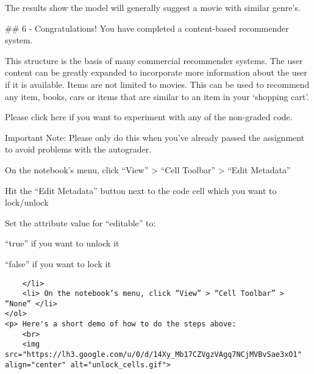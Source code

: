\documentclass[11pt]{article}
\begin{document}
    The results show the model will generally suggest a movie with similar
genre's.

    \#\# 6 - Congratulations! You have completed a content-based recommender
system.

This structure is the basis of many commercial recommender systems. The
user content can be greatly expanded to incorporate more information
about the user if it is available. Items are not limited to movies. This
can be used to recommend any item, books, cars or items that are similar
to an item in your `shopping cart'.

    Please click here if you want to experiment with any of the non-graded
code.

Important Note: Please only do this when you've already passed the
assignment to avoid problems with the autograder.

On the notebook's menu, click ``View'' \textgreater{} ``Cell Toolbar''
\textgreater{} ``Edit Metadata''

Hit the ``Edit Metadata'' button next to the code cell which you want to
lock/unlock

Set the attribute value for ``editable'' to:

``true'' if you want to unlock it

``false'' if you want to lock it

\begin{verbatim}
    </li>
    <li> On the notebook’s menu, click “View” > “Cell Toolbar” > “None” </li>
</ol>
<p> Here's a short demo of how to do the steps above: 
    <br>
    <img src="https://lh3.google.com/u/0/d/14Xy_Mb17CZVgzVAgq7NCjMVBvSae3xO1" align="center" alt="unlock_cells.gif">
\end{verbatim}


    
    
    
\end{document}
